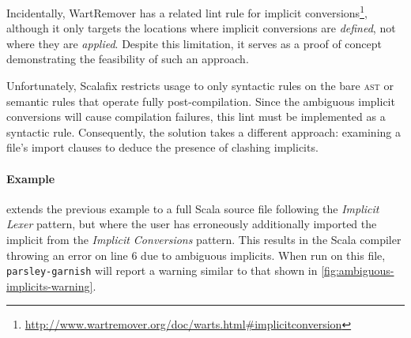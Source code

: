 \documentclass[../../main.tex]{subfiles}
\begin{document}
Incidentally, WartRemover has a related lint rule for implicit conversions\footnote{\url{http://www.wartremover.org/doc/warts.html#implicitconversion}},
although it only targets the locations where implicit conversions are \emph{defined}, not where they are \emph{applied}.
Despite this limitation, it serves as a proof of concept demonstrating the feasibility of such an approach.

Unfortunately, Scalafix restricts usage to only syntactic rules on the bare \textsc{ast} or semantic rules that operate fully post-compilation.
Since the ambiguous implicit conversions will cause compilation failures, this lint must be implemented as a syntactic rule.
Consequently, the solution takes a different approach: examining a file's import clauses to deduce the presence of clashing implicits.

\paragraph{Example}
 extends the previous example to a full Scala source file following the \emph{Implicit Lexer} pattern,
but where the user has erroneously additionally imported the  implicit from the \emph{Implicit Conversions} pattern.
This results in the Scala compiler throwing an error on line 6 due to ambiguous implicits.
When run on this file, \texttt{parsley-garnish} will report a warning similar to that shown in \cref{fig:ambiguous-implicits-warning}.
\end{document}
